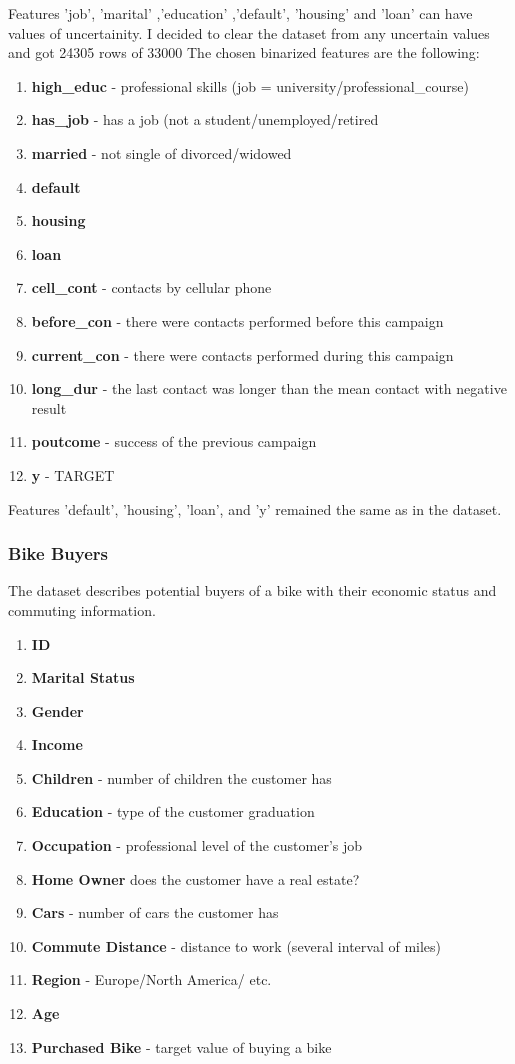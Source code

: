 Features 'job', 'marital' ,'education' ,'default', 'housing' and 'loan' can have values of uncertainity. 
I decided to clear the dataset from any uncertain values and got 24305 rows of 33000
The chosen binarized features are the following:

\begin{enumerate}
\item \textbf{high\_educ} - professional skills (job = university/professional\_course)
\item \textbf{has\_job} - has a job (not a student/unemployed/retired
\item \textbf{married} - not single of divorced/widowed
\item \textbf{default}
\item \textbf{housing}
\item \textbf{loan}
\item \textbf{cell\_cont} - contacts by cellular phone 
\item \textbf{before\_con} - there were contacts performed before this campaign
\item \textbf{current\_con} - there were contacts performed during this campaign
\item \textbf{long\_dur} - the last contact was longer than the mean contact with negative result
\item \textbf{poutcome} - success of the previous campaign
\item \textbf{y} - TARGET
\end{enumerate}

Features 'default', 'housing', 'loan', and 'y' remained the same as in the dataset. 


\subsubsection{Bike Buyers}

The dataset describes potential buyers of a bike with their economic status and commuting information.

\begin{enumerate}
\item  \textbf{ID}
\item  \textbf{Marital Status}
\item  \textbf{Gender}
\item  \textbf{Income}
\item  \textbf{Children} - number of children the customer has
\item  \textbf{Education} - type of the customer graduation
\item  \textbf{Occupation} - professional level of the customer's job
\item  \textbf{Home Owner} does the customer have a real estate?
\item  \textbf{Cars} - number of cars the customer has
\item  \textbf{Commute Distance} - distance to work (several interval of miles) 
\item  \textbf{Region} - Europe/North America/ etc.
\item  \textbf{Age}
\item  \textbf{Purchased Bike} - target value of buying a bike
\end{enumerate}

